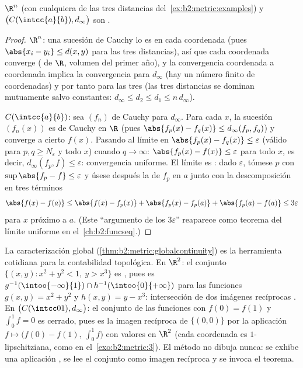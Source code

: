 \begin{theorem}\label{thm:b2:metric:rncomplete}
$\R^n$ (con cualquiera de las tres distancias del~\cref{ex:b2:metric:examples}) y $\bigl(C(\intcc{a}{b}),
d_\infty\bigr)$ son .
\end{theorem}

\begin{proof}
$\R^n$: una sucesión de Cauchy lo es en cada coordenada (pues
$\abs{x_i - y_i} \leq d(x,y)$ para las tres distancias), así que cada
coordenada converge ( de $\R$, volumen del primer año), y
la convergencia coordenada a coordenada implica la convergencia para
$d_\infty$ (hay un número finito de coordenadas) y por tanto para las
tres (las tres distancias se dominan mutuamente salvo constantes:
$d_\infty \leq d_2 \leq d_1 \leq n\,d_\infty$).

$C(\intcc{a}{b})$: sea $(f_n)$ de Cauchy para $d_\infty$. Para cada
$x$, la sucesión $(f_n(x))$ es de Cauchy en $\R$ (pues $\abs{f_p(x) -
f_q(x)} \leq d_\infty(f_p, f_q)$) y converge a cierto $f(x)$. Pasando
al límite en $\abs{f_p(x) - f_q(x)} \leq \varepsilon$ (válido para
$p, q \geq N_\varepsilon$ y todo $x$) cuando $q \to \infty$:
$\abs{f_p(x) - f(x)} \leq \varepsilon$ para todo $x$, es decir,
$d_\infty(f_p, f) \leq \varepsilon$: convergencia uniforme. El límite
es : dado $\varepsilon$, tómese $p$ con $\sup\abs{f_p - f}
\leq \varepsilon$ y úsese después la  de $f_p$ en $a$ junto
con la descomposición en tres términos
\[
\abs{f(x) - f(a)} \leq \abs{f(x) - f_p(x)} + \abs{f_p(x) - f_p(a)}
+ \abs{f_p(a) - f(a)} \leq 3\varepsilon
\]
para $x$ próximo a $a$. (Este ``argumento de los $3\varepsilon$''
reaparece como teorema del límite uniforme en el~\cref{ch:b2:funcseq}.)
\end{proof}

\begin{example}\label{ex:b2:metric:recognize}
La caracterización global (\cref{thm:b2:metric:globalcontinuity})
es la herramienta cotidiana para la contabilidad topológica. En
$\R^2$: el conjunto $\{(x, y) : x^2 + y^2 < 1,\ y > x^3\}$ es
, pues es $g^{-1}(\intoo{-\infty}{1}) \cap
h^{-1}(\intoo{0}{+\infty})$ para las funciones  $g(x,y) =
x^2 + y^2$ y $h(x, y) = y - x^3$: intersección de dos imágenes
recíprocas . En $\bigl(C(\intcc01), d_\infty\bigr)$: el
conjunto de las funciones con $f(0) = f(1)$ y $\int_0^1 f = 0$ es
cerrado, pues es la imagen recíproca de $\{(0,0)\}$ por la
aplicación  $f \mapsto \bigl(f(0) - f(1),\ \int_0^1
f\bigr)$ con valores en $\R^2$ (cada coordenada es
$1$-lipschitziana, como en el~\cref{exo:b2:metric:3}). El método no
dibuja nunca: se exhibe una aplicación , se lee el conjunto
como imagen recíproca y se invoca el teorema.
\end{example}

